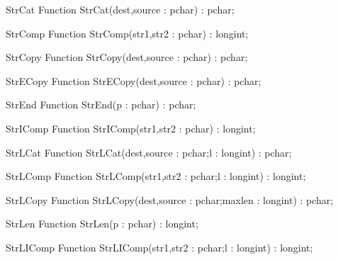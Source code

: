  
\begin{function}{StrCat}
\Declaration
Function StrCat(dest,source : pchar) : pchar;
\Description
\Errors
\SeeAlso
\end{function}

 
\begin{function}{StrComp}
\Declaration
Function StrComp(str1,str2 : pchar) : longint;
\Description
\Errors
\SeeAlso
\end{function}

 
\begin{function}{StrCopy}
\Declaration
Function StrCopy(dest,source : pchar) : pchar;
\Description
\Errors
\SeeAlso
\end{function}

 
\begin{function}{StrECopy}
\Declaration
Function StrECopy(dest,source : pchar) : pchar;
\Description
\Errors
\SeeAlso
\end{function}

 
\begin{function}{StrEnd}
\Declaration
Function StrEnd(p : pchar) : pchar;
\Description
\Errors
\SeeAlso
\end{function}

 
\begin{function}{StrIComp}
\Declaration
Function StrIComp(str1,str2 : pchar) : longint;
\Description
\Errors
\SeeAlso
\end{function}

 
\begin{function}{StrLCat}
\Declaration
Function StrLCat(dest,source : pchar;l : longint) : pchar;
\Description
\Errors
\SeeAlso
\end{function}

 
\begin{function}{StrLComp}
\Declaration
Function StrLComp(str1,str2 : pchar;l : longint) : longint;
\Description
\Errors
\SeeAlso
\end{function}

 
\begin{function}{StrLCopy}
\Declaration
Function StrLCopy(dest,source : pchar;maxlen : longint) : pchar;
\Description
\Errors
\SeeAlso
\end{function}

 
\begin{function}{StrLen}
\Declaration
Function StrLen(p : pchar) : longint;
\Description
\Errors
\SeeAlso
\end{function}

 
\begin{function}{StrLIComp}
\Declaration
Function StrLIComp(str1,str2 : pchar;l : longint) : longint;
\Description
\Errors
\SeeAlso
\end{function}

